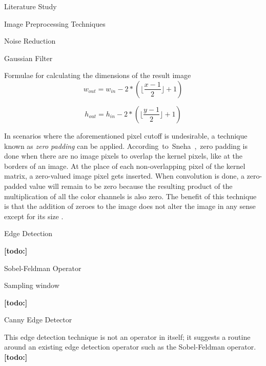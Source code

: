 \documentclass{matthijs}
\begin{document}
\begin{hoofdstuk}{Literature Study}
\begin{paragraaf}{Image Preprocessing Techniques}
\begin{subparagraaf}{Noise Reduction}
\begin{subsubparagraaf}{Gaussian Filter}
					\begin{figuur}{Formulae for calculating the dimensions of the result image}
						\begin{equation*}
							w_{out} = w_{in} - 2 * (\lfloor\frac{x - 1}{2}\rfloor + 1)
						\end{equation*}

						\vspace{-4ex}
					
						\begin{equation*}
							h_{out} = h_{in} - 2 * (\lfloor\frac{y - 1}{2}\rfloor + 1)
						\end{equation*}
					\end{figuur}

					\bigskip

					In scenarios where the aforementioned pixel cutoff is undesirable, a technique known as \textit{zero padding} can be applied.
					\mbox{According to Sneha \cite{sneha2018convolution}, zero} padding is done when there are no image pixels to overlap the kernel pixels, like at the borders of an image.
					At the place of each non-overlapping pixel of the kernel matrix, a zero-valued image pixel gets inserted.
					When convolution is done, a zero-padded value will remain to be zero because the resulting product of the multiplication of all the color channels is also zero.
					The benefit of this technique is that the addition of zeroes to the image does not alter the image in any sense except for its size \cite{sneha2018convolution}.

				\end{subsubparagraaf}

			\end{subparagraaf}

			\begin{subparagraaf}{Edge Detection}

				\textbf{[todo:]}

				\begin{subsubparagraaf}{Sobel-Feldman Operator}

					Sampling window

					\textbf{[todo:]}

				\end{subsubparagraaf}

				\begin{subsubparagraaf}{Canny Edge Detector}

					This edge detection technique is not an operator in itself; it suggests a routine around an existing edge detection operator such as the Sobel-Feldman operator.
					\textbf{[todo:]}


\end{subsubparagraaf}
\end{subparagraaf}
\end{paragraaf}
\end{hoofdstuk}
\end{document}
